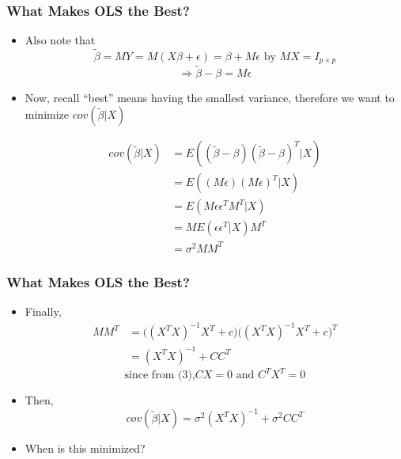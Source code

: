 \documentclass{beamer}
\begin{document}
\begin{frame}[t]\frametitle{What Makes OLS the Best?}
\begin{itemize}	

                \item Also note that
                  \[ \tilde{\beta} = MY = M(X\beta + \epsilon) = \beta
                  + M\epsilon \text{ by } MX = I_{p \times p} \]
                  \begin{equation} \Rightarrow \tilde{\beta} - \beta =
                    M\epsilon \end{equation}

                \item Now, recall ``best'' means
                  having the smallest variance, therefore we want to
                  minimize $cov(\tilde{\beta} | X)$
                 
\[ \begin{array}{rl}
cov(\tilde{\beta} | X) &= E((\tilde{\beta} - \beta)(\tilde{\beta} - \beta)^{T} | X) \\
&= E((M\epsilon)(M\epsilon)^{T} |X) \\
&= E(M\epsilon \epsilon^{T} M^{T} |X) \\
&= M E(\epsilon \epsilon^{T} | X) M^{T} \\
&= \sigma^2MM^{T}
\end{array} \]

	\end{itemize}
	\end{frame}
	


\begin{frame}[t]\frametitle{What Makes OLS the Best?}
\begin{itemize}	
\item <+-> Finally,
\[ \begin{array}{rl}
MM^{T}  &= \big((X^{T}X)^{-1}X^{T} + c\big)\big((X^{T}X)^{-1}X^{T} + c\big)^{T} \\
&= (X^{T}X)^{-1} + CC^{T}
\end{array} \]
              \begin{equation} \text{since from (3),}  CX = 0 \text{ and } C^{T}X^{T} = 0 \end{equation}
            \item <+-> Then,
     \[cov(\tilde{\beta} | X) = \sigma^2(X^{T}X)^{-1} + \sigma^2CC^{T} \]

\item<+-> When is this minimized?


	\end{itemize}
	\end{frame}
	
\end{document}
